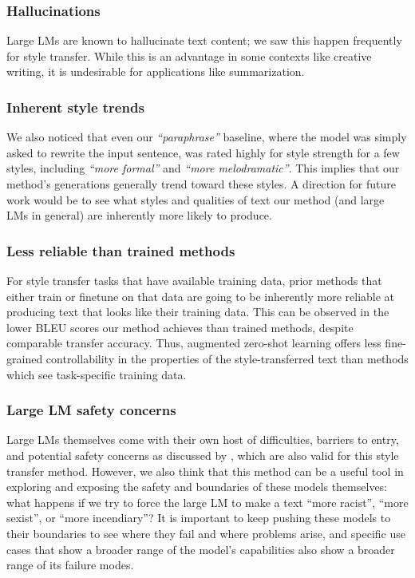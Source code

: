 \subsubsection{Hallucinations} Large LMs are known to hallucinate text content; we saw this happen frequently for style transfer. While this is an advantage in some contexts like creative writing, it is undesirable for applications like summarization. 
\subsubsection{Inherent style trends} We also noticed that even our \textit{``paraphrase''} baseline, where the model was simply asked to rewrite the input sentence, was rated highly for style strength for a few styles, including \textit{``more formal''} and \textit{``more melodramatic''}.
This implies that our method's generations generally trend toward these styles.
A direction for future work would be to see what styles and qualities of text our method (and large LMs in general) are inherently more likely to produce.

\subsubsection{Less reliable than trained methods}
For style transfer tasks that have available training data, prior methods that either train or finetune on that data are going to be inherently more reliable at producing text that looks like their training data.
This can be observed in the lower BLEU scores our method achieves than trained methods, despite comparable transfer accuracy.
Thus, augmented zero-shot learning offers less fine-grained controllability in the properties of the style-transferred text than methods which see task-specific training data.

\subsubsection{Large LM safety concerns} Large LMs themselves come with their own host of difficulties, barriers to entry, and potential safety concerns as discussed by \citet{bender2021stochastic}, which are also valid for this style transfer method. However, we also think that this method can be a useful tool in exploring and exposing the safety and boundaries of these models themselves: what happens if we try to force the large LM to make a text ``more racist'', ``more sexist'', or ``more incendiary''? It is important to keep pushing these models to their boundaries to see where they fail and where problems arise, and specific use cases that show a broader range of the model's capabilities also show a broader range of its failure modes.


